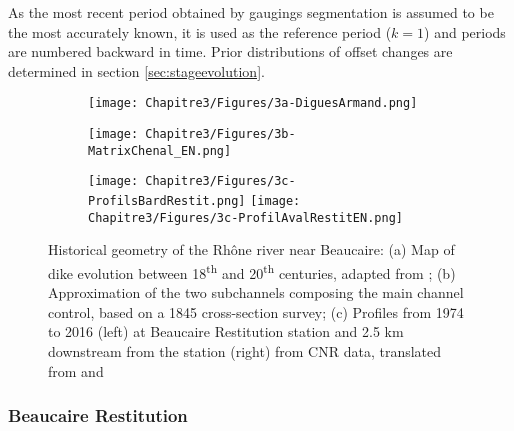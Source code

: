        As the most recent period obtained by gaugings segmentation is assumed to be the most accurately known, it is used as the reference period ($k=1$) and periods are numbered backward in time. Prior distributions of offset changes are determined in section \ref{sec:stageevolution}.       

        \begin{figure}[h!]
            \centering
            \begin{subfigure}{0.7\linewidth}
            \centering
            \texttt{[image: Chapitre3/Figures/3a-DiguesArmand.png]}\hfill
            \caption{}
            \label{subfig:diguesarmand}
            \end{subfigure}
            
            \begin{subfigure}{0.6\linewidth}
            \centering
            \texttt{[image: Chapitre3/Figures/3b-MatrixChenal\_EN.png]}
            \caption{}
            \label{subfig:matrixCh}
            \end{subfigure}
            
            \begin{subfigure}{.9\linewidth}
            \texttt{[image: Chapitre3/Figures/3c-ProfilsBardRestit.png]}
            \texttt{[image: Chapitre3/Figures/3c-ProfilAvalRestitEN.png]}
            \caption{}
            \label{subfig:avalprofilesRestit}
            \end{subfigure}
            
            \caption{Historical geometry of the Rhône river near Beaucaire: (a) Map of dike evolution between 18\textsuperscript{th} and 20\textsuperscript{th} centuries, adapted from \citet{armand_ii_1907}; (b) Approximation of the two subchannels composing the main channel control, based on a 1845 cross-section survey; (c) Profiles from 1974 to 2016 (left) at Beaucaire Restitution station and 2.5 km downstream from the station (right) from CNR data, translated from \citet{bard_actualisation_2018} and \citet{medd_debit_2005}}
            \label{fig:groupPriorPt}
        \end{figure}


        \subsubsection{Beaucaire Restitution}
        

